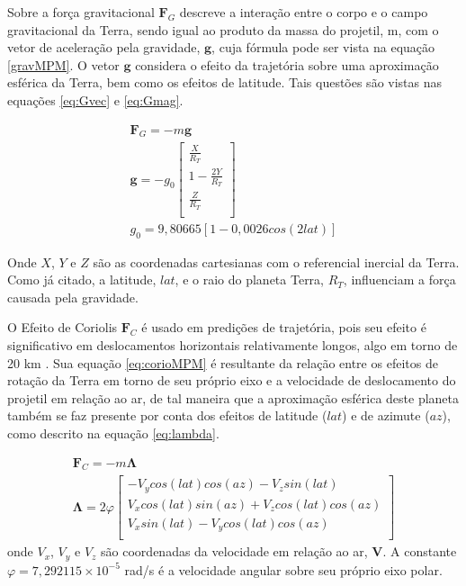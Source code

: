 Sobre a força gravitacional $\boldsymbol{F}_{G}$ descreve a interação entre o corpo e o campo gravitacional da Terra, sendo igual ao produto da massa do projetil, m, com o vetor de aceleração pela gravidade, $\boldsymbol{g}$, cuja fórmula pode ser vista na equação \ref{gravMPM}. O vetor $\boldsymbol{g}$ considera o efeito da trajetória sobre uma aproximação esférica da Terra, bem como os efeitos de latitude. Tais questões são vistas nas equações \ref{eq:Gvec} e \ref{eq:Gmag}.

\begin{gather}
    \label{gravMPM}
    \boldsymbol{F}_{G} = -m\boldsymbol{g} \\
    \label{eq:Gvec}
    \boldsymbol{g} = -g_{0}\begin{bmatrix} 
        \frac{X}{R_{T}} \\
        1 - \frac{2Y}{R_{T}}\\
        \frac{Z}{R_{T}} \\
    \end{bmatrix} \\
    \label{eq:Gmag}
    g_{0} = 9,80665[1 - 0,0026cos(2lat)] 
\end{gather}

Onde $X$, $Y$ e $Z$ são as coordenadas cartesianas com o referencial inercial da Terra. Como já citado, a latitude, $lat$, e o raio do planeta Terra, $R_{T}$, influenciam a força causada pela gravidade.

O Efeito de Coriolis $\boldsymbol{F}_{C}$ é usado em predições de trajetória, pois seu efeito é significativo em deslocamentos horizontais relativamente longos, algo em torno de 20 km \cite{McCoy2012}. Sua equação \ref{eq:corioMPM} é resultante da relação entre os efeitos de rotação da Terra em torno de seu próprio eixo e a velocidade de deslocamento do projetil em relação ao ar, de tal maneira que a aproximação esférica deste planeta também se faz presente por conta dos efeitos de latitude ($lat$) e de azimute ($az$), como descrito na equação \ref{eq:lambda}.

\begin{gather}
\label{eq:corioMPM}
\boldsymbol{F}_{C} = -m\boldsymbol{\Lambda} \\
\label{eq:lambda}
\boldsymbol{\Lambda} = 2\varphi
\begin{bmatrix} 
    -V_{y}cos(lat)cos(az) - V_{z}sin(lat) \\
    V_{x}cos(lat)sin(az) + V_{z}cos(lat)cos(az)\\
    V_{x}sin(lat) - V_{y}cos(lat)cos(az) \\
\end{bmatrix}
\end{gather}
%
onde $V_{x}$, $V_{y}$ e $V_{z}$ são coordenadas da velocidade em relação ao ar, $\boldsymbol{V}$. A constante $\varphi = 7,292115 \times 10^{-5}$ rad/s é a velocidade angular sobre seu próprio eixo polar.

